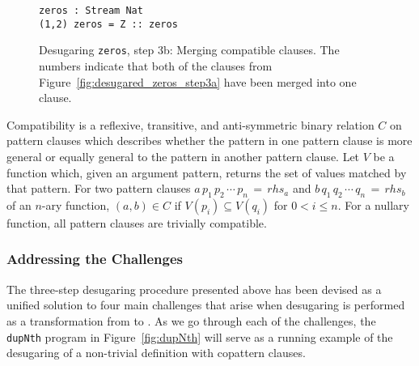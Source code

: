 \begin{figure}
\begin{lstlisting}[mathescape]
zeros : Stream Nat
(1,2) zeros = Z :: zeros 
\end{lstlisting}
  \caption{Desugaring \texttt{zeros}, step 3b: Merging compatible clauses. The
    numbers indicate that both of the clauses from
    Figure~\ref{fig:desugared_zeros_step3a} have been merged into one clause.}
  \label{fig:desugared_zeros_step3b}
\end{figure}

\begin{definition}
\label{def:compatibility}
  Compatibility is a reflexive, transitive, and anti-symmetric binary relation
  $C$ on pattern clauses which describes whether the pattern in one pattern
  clause is more general or equally general to the pattern in another pattern
  clause. Let $V$ be a function which, given an argument pattern, returns the set of
  values matched by that pattern. For two pattern clauses
  $a\,p_{1}\,p_{2}\,\cdots\,p_{n}\,=\,rhs_{a}$ and
  $b\,q_{1}\,q_{2}\,\cdots\,q_{n}\,=\,rhs_{b}$ of an $n$-ary function,
  $(a,b)\in C$ if $V(p_{i})\subseteq V(q_{i})$ for $0 < i\le n$. For a nullary
  function, all pattern clauses are trivially compatible.
\end{definition}

\subsubsection{Addressing the Challenges}
The three-step desugaring procedure presented above has been devised as a
unified solution to four main challenges that arise when desugaring is performed
as a transformation from \IdrisM{} to \IdrisM{}. As we go through each of the
challenges, the \texttt{dupNth} program in Figure~\ref{fig:dupNth} will serve as
a running example of the desugaring of a non-trivial definition with copattern
clauses.

